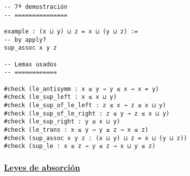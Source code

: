 \begin{verbatim}
-- 7ª demostración
-- ===============

example : (x ⊔ y) ⊔ z = x ⊔ (y ⊔ z) :=
-- by apply?
sup_assoc x y z

-- Lemas usados
-- ============

#check (le_antisymm : x ≤ y → y ≤ x → x = y)
#check (le_sup_left : x ≤ x ⊔ y)
#check (le_sup_of_le_left : z ≤ x → z ≤ x ⊔ y)
#check (le_sup_of_le_right : z ≤ y → z ≤ x ⊔ y)
#check (le_sup_right : y ≤ x ⊔ y)
#check (le_trans : x ≤ y → y ≤ z → x ≤ z)
#check (sup_assoc x y z : (x ⊔ y) ⊔ z = x ⊔ (y ⊔ z))
#check (sup_le : x ≤ z → y ≤ z → x ⊔ y ≤ z)
\end{verbatim}

\subsubsection{\href{./src/Basicos/Leyes\_de\_absorcion.lean}{Leyes de absorción}}
\label{sec:orgb5deb4f}
